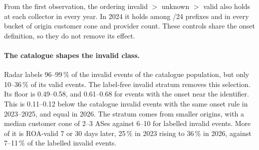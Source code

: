 From the first observation, the ordering invalid $>$ unknown $>$ valid also holds at each collector in every year.
In 2024 it holds among /24 prefixes and in every bucket of origin customer cone and provider count.
These controls share the onset definition, so they do not remove its effect.

\paragraph{The catalogue shapes the invalid class.}
Radar labels 96--99\,\% of the invalid events of the catalogue population, but only 10--36\,\% of its valid events.
The label-free invalid stratum removes this selection.
Its floor is 0.49--0.58, and 0.61--0.68 for events with the onset near the identifier.
This is 0.11--0.12 below the catalogue invalid events with the same onset rule in 2023--2025, and equal in 2026.
The stratum comes from smaller origins, with a median customer cone of 2--3 ASes against 6--10 for labelled invalid events.
More of it is ROA-valid 7 or 30 days later, 25\,\% in 2023 rising to 36\,\% in 2026, against 7--11\,\% of the labelled invalid events.

